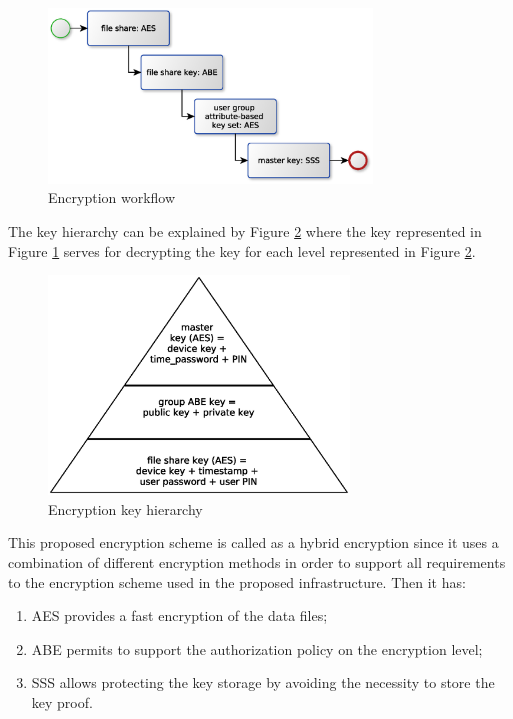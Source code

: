 \documentclass[twocolumn]{svjour3}          	%
\begin{document}
\begin{figure}[h!]
	\centering
	\includegraphics[width=8.6cm]{figures/encryptionworkflow.eps}
	\caption{Encryption workflow}
	\label{fig:9}
\end{figure}

The key hierarchy can be explained by Figure \ref{fig:10} where the key represented in Figure \ref{fig:9} serves for decrypting the key for each level represented in Figure \ref{fig:10}.

\begin{figure}[h!]
	\centering
	\includegraphics[width=8cm]{figures/encryptionkeyhierarchy.eps}
	\caption{Encryption key hierarchy}
	\label{fig:10}
\end{figure}

This proposed encryption scheme is called as a hybrid encryption since it uses a combination of different encryption methods in order to support all requirements to the encryption scheme used in the proposed infrastructure. Then it has:

\begin{enumerate}
	\item AES provides a fast encryption of the data files;
	\item ABE permits to support the authorization policy on the encryption level;
	\item SSS allows protecting the key storage by avoiding the necessity to store the key proof.
\end{enumerate}
\end{document}
